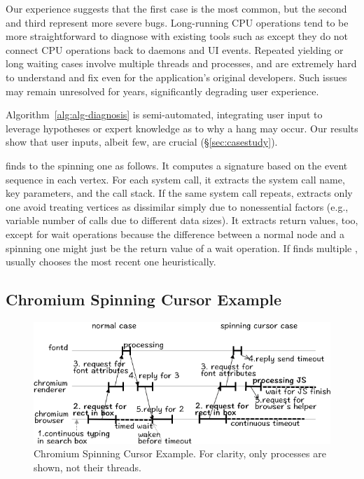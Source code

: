 Our experience suggests that the first case is the most common, but the
second and third represent more severe bugs. Long-running CPU operations
tend to be more straightforward to diagnose with existing tools such as
\spindump except they do not connect CPU operations back to daemons and UI
events. Repeated yielding or long waiting cases involve multiple threads
and processes, and are extremely hard to understand and fix even for the
application's original developers.  Such issues may remain unresolved for
years, significantly degrading user experience.

Algorithm~\ref{alg:alg-diagnosis} is semi-automated, integrating user
input to leverage hypotheses or expert knowledge as to why a hang may
occur. Our results show that user inputs, albeit few, are crucial
(\S\ref{sec:casestudy}).

 \xxx finds \similarnodes to the spinning one
as follows. It computes a signature based on the event sequence in each
vertex. For each system call, it extracts the system call name, key
parameters, and the call stack. If the same system call repeats, \xxx
extracts only one avoid treating vertices as dissimilar simply due to
nonessential factors (e.g., variable number of  calls due to
different data sizes).  It extracts return values, too, except for wait
operations because the difference between a normal node and a spinning one
might just be the return value of a wait operation.  If \xxx finds
multiple \similarnodes, \xxx usually chooses the most recent one
heuristically.

\subsection{Chromium Spinning Cursor Example} \label{subsec:chromium}

\begin{figure}[tb]
	\footnotesize
    \centering
	\includegraphics[width=\columnwidth]{./figures/chromium_case_study_1.png}
    \caption{Chromium Spinning Cursor Example. For clarity, only processes are
shown, not their threads.}
    \label{fig:chromium-case-study}
\end{figure}

